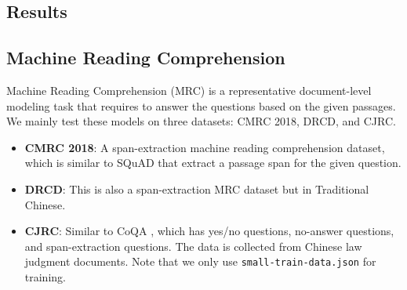 \documentclass[journal]{IEEEtran}
\begin{document}
\begin{CJK*}{UTF8}{gbsn}
\section{Results}\label{sec-results}
\subsection{Machine Reading Comprehension}\label{sec-results-mrc}
Machine Reading Comprehension (MRC) is a representative document-level modeling task that requires to answer the questions based on the given passages.
We mainly test these models on three datasets: CMRC 2018, DRCD, and CJRC.
\begin{itemize}
	\item {\bf CMRC 2018}: A span-extraction machine reading comprehension dataset, which is similar to SQuAD \cite{rajpurkar-etal-2016} that extract a passage span for the given question.
	\item {\bf DRCD}: This is also a span-extraction MRC dataset but in Traditional Chinese. 
	\item {\bf CJRC}: Similar to CoQA \cite{reddy2019coqa}, which has yes/no questions, no-answer questions, and span-extraction questions. The data is collected from Chinese law judgment documents. Note that we only use {\tt small-train-data.json} for training. 
 \end{itemize}



\end{CJK*}
\end{document}
